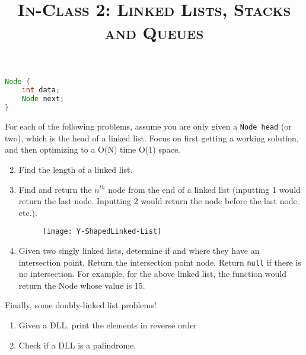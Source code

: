 \documentclass{article}
\title{\large{\textsc{In-Class 2: Linked Lists, Stacks and Queues}}}
\date{}
\begin{document}
\maketitle


\begin{lstlisting}[language=Java]
Node {
    int data;
    Node next;
}

\end{lstlisting}

\noindent For each of the following problems, assume you are only given a \texttt{Node head} (or two), which is the head of a linked list. Focus on first getting a working solution, and then optimizing to a O(N) time O(1) space.

\begin{enumerate}

\setcounter{enumi}{1}

\item Find the length of a linked list.

\item Find and return the $n^{th}$ node from the end of a linked list (inputting 1 would return the last node. Inputting 2 would return the node before the last node. etc.).

\begin{figure}[h!]
\texttt{[image: Y-ShapedLinked-List]}
\centering
\end{figure}

\item Given two singly linked lists, determine if and where they have an intersection point. Return the intersection point node. Return \texttt{null} if there is no intersection. For example, for the above linked list, the function would return the Node whose value is 15.

\end{enumerate}

\noindent Finally, some doubly-linked list problems!

\begin{enumerate}

\begin{lstlisting}[language=Java]
Node {
    int data;
    Node next, prev;
}
\end{lstlisting}

\setcounter{enumi}{8}

\item Given a DLL, print the elements in reverse order

\item Check if a DLL is a palindrome.

    
\end{enumerate}
\end{document}
